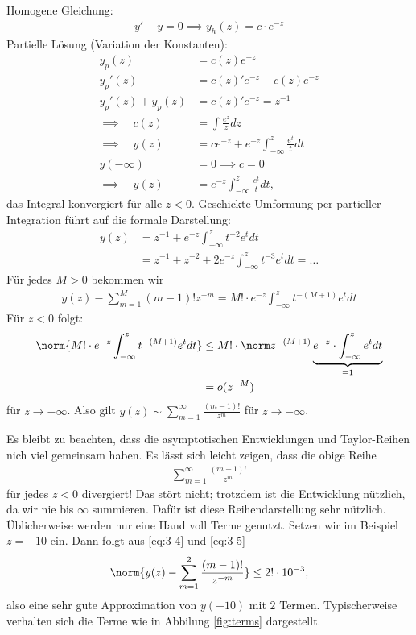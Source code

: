 \begin{beispiel}
Homogene Gleichung:
\begin{align*}
  y' + y = 0\implies y_{h}(z) = c\cdot e^{-z}
\end{align*}
Partielle Lösung (Variation der Konstanten):
\begin{align*}
  y_{p}(z) &= c(z)e^{-z}\\
  y_{p}'(z) &= c(z)'e^{-z} - c(z)e^{-z}\\
  y_{p}'(z) + y_{p}(z) &= c(z)'e^{-z}  = z^{-1}\\
\implies \quad c(z) &= \int \frac {e^{z}} z dz\\
\implies \quad y(z) &= c e^{-z} + e^{-z} \int_{- \infty}^{z} \frac{e^{t}}{t}dt\\
 y(-\infty)&= 0 \implies c = 0\\
\implies \quad y(z) &= e^{-z} \int_{- \infty}^{z} \frac{e^{t}}{t}dt, 
\end{align*}
das Integral konvergiert für alle $z < 0$. Geschickte Umformung per partieller Integration führt auf die formale Darstellung:
\begin{align*}
  y(z) &= z^{-1} + e^{-z} \int_{-\infty}^{z} t^{-2} e^{t}dt\\
&= z^{-1} + z^{-2} + 2e^{-z} \int_{-\infty}^{z} t^{-3} e^{t}dt = \dots 
\end{align*}
Für jedes $M> 0$ bekommen wir
\begin{align}\label{eq:3-4}
  y(z) - \sum_{m = 1}^{M}(m-1)! z^{-m} = M! \cdot e^{-z} \int_{-\infty}^{z}t^{-(M+1)}e^{t}dt
\end{align}
Für $z <0$ folgt:
\begin{align}\label{eq:3-5}
  \norm {M! \cdot e^{-z} \int_{- \infty}^{z} t^{-(M+1)} e^{t}dt}&\leq M!\cdot \norm z^{-(M+1)}\underbrace{e^{-z}\cdot\int_{-\infty}^{z}e^{t}dt}_{= 1}\\
&= o(z^{-M})\notag
\end{align}
für $z \to -\infty$. Also gilt $y(z) \sim \sum_{m = 1}^{\infty} \frac{(m-1)!}{z^{m}}$ für $z \to -\infty$.
\end{beispiel}
Es bleibt zu beachten, dass die asymptotischen Entwicklungen und Taylor-Reihen nich viel gemeinsam haben. Es lässt sich leicht zeigen, dass die obige Reihe
\begin{align*}
  \sum_{ m = 1}^{\infty} \frac{(m-1)!}{z^{m}}
\end{align*}
für jedes $z < 0$ divergiert! Das stört nicht; trotzdem ist die Entwicklung nützlich, da wir nie bis $\infty$ summieren. Dafür ist diese Reihendarstellung sehr nützlich. Üblicherweise werden nur eine Hand voll Terme genutzt. Setzen wir im Beispiel $z  = - 10$ ein. Dann folgt aus \eqref{eq:3-4} und \eqref{eq:3-5}
\begin{align*}
  \norm{y(z) - \sum_{m = 1}^{2}\frac{(m-1)!} {z^{-m}}} \leq 2! \cdot 10^{-3}, 
\end{align*}
also eine sehr gute Approximation von $y(-10)$ mit $2$ Termen. Typischerweise verhalten sich die Terme wie in Abbilung \ref{fig:terms} dargestellt. 

